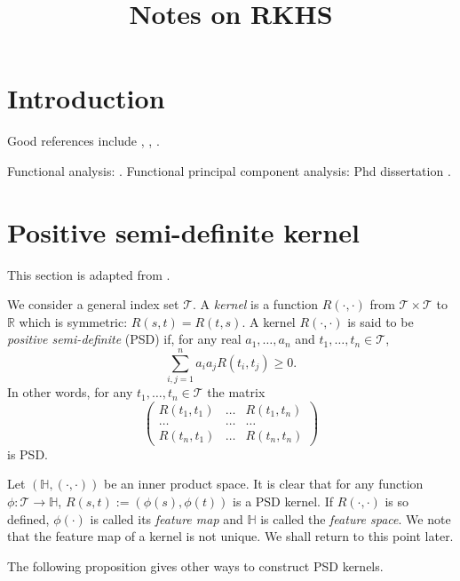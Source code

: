 \documentclass[11pt]{article}
\title{Notes on RKHS}
\theoremstyle{plain}
\theoremstyle{definition}
\theoremstyle{remark}
\begin{document}
\maketitle
\section{Introduction}
Good references include \cite{book:1273182}, \cite{book:982265},  \cite{book:274797}.

Functional analysis: \cite{Roman2010Functional}.
Functional principal component analysis: Phd dissertation \cite{Amini2013High}.

\section{Positive semi-definite kernel}
This section is adapted from \cite{hofmann2008}.

We consider a general index set $\mathcal{T}$.
A \emph {kernel} is a function $R(\cdot,\cdot)$ from $\mathcal{T}\times \mathcal{T}$ to $\mathbb{R}$ which is symmetric: $R(s,t)=R(t,s)$.
A kernel $R(\cdot,\cdot)$ is said to be \emph{positive semi-definite} (PSD) if, for any real $a_1,\ldots,a_n$ and $t_1,\ldots, t_n \in \mathcal{T}$,
\begin{equation*}
    \sum_{i,j=1}^n a_i a_j R(t_i,t_j)\geq 0.
\end{equation*}
In other words, for any $t_1,\ldots,t_n \in \mathcal{T}$ the matrix
\begin{equation*}
    \begin{pmatrix}
        R(t_1,t_1) & \ldots & R(t_1,t_n)\\
        \ldots& \ldots & \ldots\\
        R(t_n,t_1) & \ldots & R(t_n,t_n)
    \end{pmatrix}
\end{equation*}
is PSD.

Let $(\mathbb H, (\cdot,\cdot))$ be an inner product space.
It is clear that for any function $\phi:\mathcal T \to \mathbb H$, $R(s,t):=(\phi(s),  \phi(t))$ is a PSD kernel.
If $R(\cdot,\cdot)$ is so defined, $\phi(\cdot)$ is called its \emph{feature map} and  $\mathbb H$ is called the \emph{feature space}.
We note that the feature map of a kernel is not unique.
We shall return to this point later.

The following proposition gives other ways to construct PSD kernels.
\end{document}
